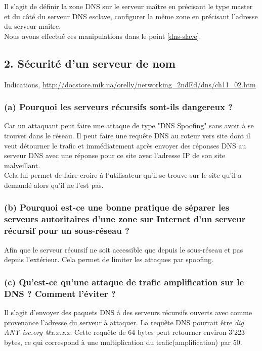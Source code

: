\documentclass{article}
\begin{document}
Il s'agit de définir la zone DNS sur le serveur maître en précisant le type master et du côté du serveur DNS esclave, configurer la même zone en précisant l'adresse du serveur maître.\\

Nous avons effectué ces manipulations dans le point \ref{dns-slave}.

\subsection*{2. Sécurité d’un serveur de nom}
Indications,  \url{http://docstore.mik.ua/orelly/networking_2ndEd/dns/ch11_02.htm}

\subsubsection*{(a) Pourquoi les serveurs récursifs sont-ils dangereux ?}
Car un attaquant peut faire une attaque de type "DNS Spoofing" sans avoir à se trouver dans le réseau. Il peut faire une requête DNS au roteur vers site dont il veut détourner le trafic et immédiatement après envoyer des réponses DNS au serveur DNS avec une réponse pour ce site avec l'adresse IP de son site malveillant.\cite{attaques}\\

Cela lui permet de faire croire à l'utilisateur qu'il se trouve sur le site qu'il a demandé alors qu'il ne l'est pas.

\subsubsection*{(b) Pourquoi est-ce une bonne pratique de séparer les serveurs autoritaires d’une zone sur Internet d’un serveur récursif pour un sous-réseau ?}
Afin que le serveur récursif ne soit accessible que depuis le sous-réseau et pas depuis l'extérieur. Cela permet de limiter les attaques par spoofing.

\subsubsection*{(c) Qu’est-ce qu’une attaque de trafic amplification sur le DNS ? Comment l’éviter ?}
Il s'agit d'envoyer des paquets DNS à des serveurs récursifs ouverts avec comme provenance l'adresse du serveur à attaquer. La requête DNS pourrait être \textit{dig ANY isc.org @x.x.x.x}. Cette requête de 64 bytes peut retourner environ 3'223 bytes, ce qui correspond à une multiplication du  trafic(amplification) par 50.\cite{DDOS}\cite{amplification}\\
\end{document}
